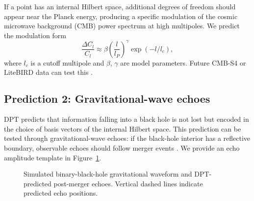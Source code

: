 \documentclass[11pt,a4paper]{article}
\theoremstyle{definition}
\begin{document}
If a point has an internal Hilbert space, additional degrees of freedom should appear near the Planck energy, producing a specific modulation of the cosmic microwave background (CMB) power spectrum at high multipoles. We predict the modulation form
\begin{equation}
\frac{\Delta C_l}{C_l} \approx \beta \left(\frac{l}{l_P}\right)^{\gamma} \exp(-l/l_c),
\end{equation}
where $l_c$ is a cutoff multipole and $\beta$, $\gamma$ are model parameters. Future CMB-S4 or LiteBIRD data can test this \cite{abazajian2016}.

\subsection{Prediction 2: Gravitational-wave echoes}

DPT predicts that information falling into a black hole is not lost but encoded in the choice of basis vectors of the internal Hilbert space. This prediction can be tested through gravitational-wave echoes: if the black-hole interior has a reflective boundary, observable echoes should follow merger events \cite{abedi2017}. We provide an echo amplitude template in Figure~\ref{fig:echoes}.

\begin{figure}[htbp]
\centering
{}
\caption{Simulated binary-black-hole gravitational waveform and DPT-predicted post-merger echoes. Vertical dashed lines indicate predicted echo positions.}
\label{fig:echoes}
\end{figure}
\end{document}
